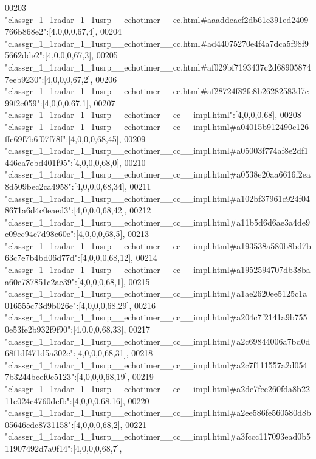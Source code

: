 \begin{DoxyCode}
00203 \textcolor{stringliteral}{"classgr\_1\_1radar\_1\_1usrp\_\_echotimer\_\_cc.html#aaaddeacf2db61e391ed2409766b868e2"}:[4,0,0,0,67,4],
00204 \textcolor{stringliteral}{"classgr\_1\_1radar\_1\_1usrp\_\_echotimer\_\_cc.html#ad44075270e4f4a7dca5f98f95662dde2"}:[4,0,0,0,67,3],
00205 \textcolor{stringliteral}{"classgr\_1\_1radar\_1\_1usrp\_\_echotimer\_\_cc.html#af029bf7193437c2d689058747eeb9230"}:[4,0,0,0,67,2],
00206 \textcolor{stringliteral}{"classgr\_1\_1radar\_1\_1usrp\_\_echotimer\_\_cc.html#af28724f82fe8b26282583d7c99f2c059"}:[4,0,0,0,67,1],
00207 \textcolor{stringliteral}{"classgr\_1\_1radar\_1\_1usrp\_\_echotimer\_\_cc\_\_impl.html"}:[4,0,0,0,68],
00208 \textcolor{stringliteral}{"classgr\_1\_1radar\_1\_1usrp\_\_echotimer\_\_cc\_\_impl.html#a04015b912490c126ffc69f7b6f07f78f"}:[4,0,0,0,68,45],
00209 \textcolor{stringliteral}{"classgr\_1\_1radar\_1\_1usrp\_\_echotimer\_\_cc\_\_impl.html#a05003f774af8e2df1446ca7ebd401f95"}:[4,0,0,0,68,0],
00210 \textcolor{stringliteral}{"classgr\_1\_1radar\_1\_1usrp\_\_echotimer\_\_cc\_\_impl.html#a0538e20aa6616f2ea8d509bec2ca4958"}:[4,0,0,0,68,34],
00211 \textcolor{stringliteral}{"classgr\_1\_1radar\_1\_1usrp\_\_echotimer\_\_cc\_\_impl.html#a102bf37961c924f048671a6d4c0eaed3"}:[4,0,0,0,68,42],
00212 \textcolor{stringliteral}{"classgr\_1\_1radar\_1\_1usrp\_\_echotimer\_\_cc\_\_impl.html#a11b5d6d6ae3a4de9c09ec94c7d98c60e"}:[4,0,0,0,68,5],
00213 \textcolor{stringliteral}{"classgr\_1\_1radar\_1\_1usrp\_\_echotimer\_\_cc\_\_impl.html#a193538a580b8bd7b63c7e7b4bd06d77d"}:[4,0,0,0,68,12],
00214 \textcolor{stringliteral}{"classgr\_1\_1radar\_1\_1usrp\_\_echotimer\_\_cc\_\_impl.html#a1952594707db38baa60e787851c2ae39"}:[4,0,0,0,68,1],
00215 \textcolor{stringliteral}{"classgr\_1\_1radar\_1\_1usrp\_\_echotimer\_\_cc\_\_impl.html#a1ae2620ee5125c1a016555c73d9b026e"}:[4,0,0,0,68,29],
00216 \textcolor{stringliteral}{"classgr\_1\_1radar\_1\_1usrp\_\_echotimer\_\_cc\_\_impl.html#a204c7f2141a9b7550e53fe2b932f9f90"}:[4,0,0,0,68,33],
00217 \textcolor{stringliteral}{"classgr\_1\_1radar\_1\_1usrp\_\_echotimer\_\_cc\_\_impl.html#a2c69844006a7bd0d68f1df471d5a302c"}:[4,0,0,0,68,31],
00218 \textcolor{stringliteral}{"classgr\_1\_1radar\_1\_1usrp\_\_echotimer\_\_cc\_\_impl.html#a2c7f111557a2d0547b3244bcef0c5123"}:[4,0,0,0,68,19],
00219 \textcolor{stringliteral}{"classgr\_1\_1radar\_1\_1usrp\_\_echotimer\_\_cc\_\_impl.html#a2de7fee260fda8b2211e024c4760dcfb"}:[4,0,0,0,68,16],
00220 \textcolor{stringliteral}{"classgr\_1\_1radar\_1\_1usrp\_\_echotimer\_\_cc\_\_impl.html#a2ee586fe560580d8b05646cdc8731158"}:[4,0,0,0,68,2],
00221 \textcolor{stringliteral}{"classgr\_1\_1radar\_1\_1usrp\_\_echotimer\_\_cc\_\_impl.html#a3fccc117093ead0b511907492d7a0f14"}:[4,0,0,0,68,7],

\end{DoxyCode}
